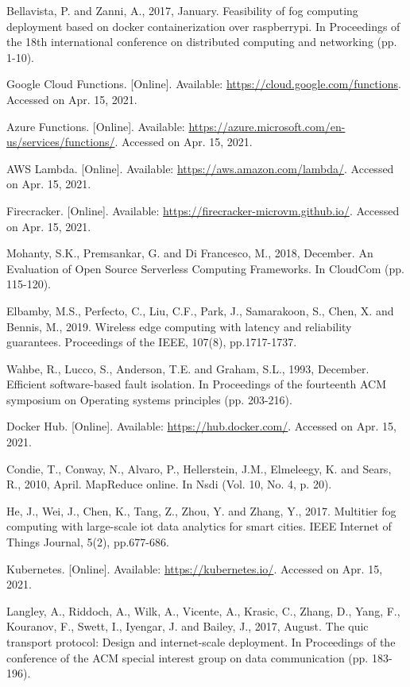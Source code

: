 \documentclass{ieeeaccess}
\begin{document}
\begin{thebibliography}{00}
 Bellavista, P. and Zanni, A., 2017, January. Feasibility of fog computing deployment based on docker containerization over raspberrypi. In Proceedings of the 18th international conference on distributed computing and networking (pp. 1-10).

 Google Cloud Functions. [Online]. Available: \url{https://cloud.google.com/functions}. Accessed on Apr. 15, 2021.

 Azure Functions. [Online]. Available: \url{https://azure.microsoft.com/en-us/services/functions/}. Accessed on Apr. 15, 2021.

 AWS Lambda. [Online]. Available: \url{https://aws.amazon.com/lambda/}. Accessed on Apr. 15, 2021.

 Firecracker. [Online]. Available: \url{https://firecracker-microvm.github.io/}. Accessed on Apr. 15, 2021.

 Mohanty, S.K., Premsankar, G. and Di Francesco, M., 2018, December. An Evaluation of Open Source Serverless Computing Frameworks. In CloudCom (pp. 115-120).

 Elbamby, M.S., Perfecto, C., Liu, C.F., Park, J., Samarakoon, S., Chen, X. and Bennis, M., 2019. Wireless edge computing with latency and reliability guarantees. Proceedings of the IEEE, 107(8), pp.1717-1737.

 Wahbe, R., Lucco, S., Anderson, T.E. and Graham, S.L., 1993, December. Efficient software-based fault isolation. In Proceedings of the fourteenth ACM symposium on Operating systems principles (pp. 203-216).

 Docker Hub. [Online]. Available: \url{https://hub.docker.com/}. Accessed on Apr. 15, 2021.

 Condie, T., Conway, N., Alvaro, P., Hellerstein, J.M., Elmeleegy, K. and Sears, R., 2010, April. MapReduce online. In Nsdi (Vol. 10, No. 4, p. 20).

 He, J., Wei, J., Chen, K., Tang, Z., Zhou, Y. and Zhang, Y., 2017. Multitier fog computing with large-scale iot data analytics for smart cities. IEEE Internet of Things Journal, 5(2), pp.677-686.

 Kubernetes. [Online]. Available: \url{https://kubernetes.io/}. Accessed on Apr. 15, 2021.

 Langley, A., Riddoch, A., Wilk, A., Vicente, A., Krasic, C., Zhang, D., Yang, F., Kouranov, F., Swett, I., Iyengar, J. and Bailey, J., 2017, August. The quic transport protocol: Design and internet-scale deployment. In Proceedings of the conference of the ACM special interest group on data communication (pp. 183-196).


\end{thebibliography}
\end{document}
